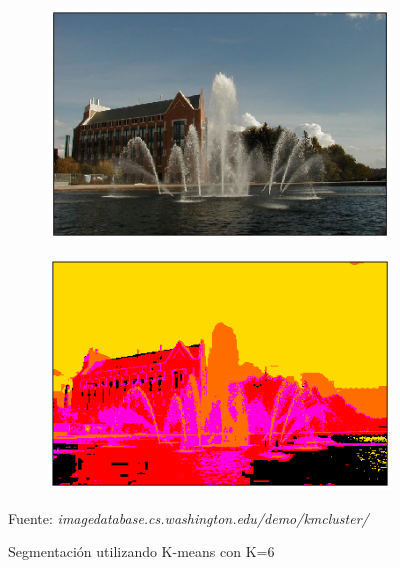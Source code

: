 \begin{figure}[H]
	\centering
	\captionsetup{justification=centering}
	\begin{subfigure}[t]{2.5in}
		\centering
		\includegraphics[width=1\textwidth]{./imagenes/clustering3}
		\label{clustering3}
	\end{subfigure}
	\begin{subfigure}[t]{2.5in}
		\centering
		\includegraphics[width=1\textwidth]{./imagenes/clustering4}
		\label{clustering4}
	\end{subfigure}
	\caption{Segmentaci\'{o}n utilizando K-means con K=6}
	\vspace{2 mm}
	\label{clusteringTotal2}			
	Fuente: \textit{imagedatabase.cs.washington.edu/demo/kmcluster/}
\end{figure}

